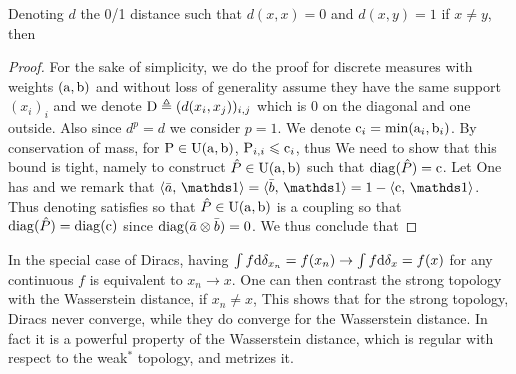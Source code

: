\begin{prop}\label{prop-rel-wass-tv}
	Denoting $d$ the 0/1 distance such that $d(x,x)=0$ and $d(x,y)=1$ if $x \neq y$, then 
\end{prop}
\begin{proof}
	For the sake of simplicity, we do the proof for discrete measures with weights $(\a,\b)$ and without loss of generality assume they have the same support $(x_i)_i$ and we denote $\D \triangleq (d(x_i,x_j))_{i,j}$ which is 0 on the diagonal and one outside. 
	Also since $d^p=d$ we consider $p=1$. 
	We denote $\text{c}_i = \min(\a_i,\b_i)$.
	By conservation of mass, for $\P \in \CouplingsD(\a,\b)$, $\P_{i,i} \leq \text{c}_i$, thus
	We need to show that this bound is tight, namely to construct $\hat P \in \CouplingsD(\a,\b)$ such that 
	$\diag(\hat P)=\text{c}$. Let 
	One has 
	and we remark that $\dotp{\bar a}{\ones} = \dotp{\bar b}{\ones} = 1-\dotp{\text{c}}{\ones}$.
	Thus denoting 
	satisfies 
	so that $\hat P \in \CouplingsD(\a,\b)$  is a coupling so that $\diag(\hat P) = \diag(\text{c})$ since $\diag( \bar a \otimes \bar b )=0$. We thus conclude that
\end{proof}

In the special case of Diracs, having $\int f \d\de_{x_n} = f(x_n) \rightarrow \int f \d\de_{x} = f(x)$ for any continuous $f$ is equivalent to $x_n \rightarrow x$. One can then contrast the strong topology with the Wasserstein distance, if $x_n \neq x$, 
This shows that for the strong topology, Diracs never converge, while they do converge for the Wasserstein distance. In fact it is a powerful property of the Wasserstein distance, which is regular with respect to the weak$^*$ topology, and metrizes it.

